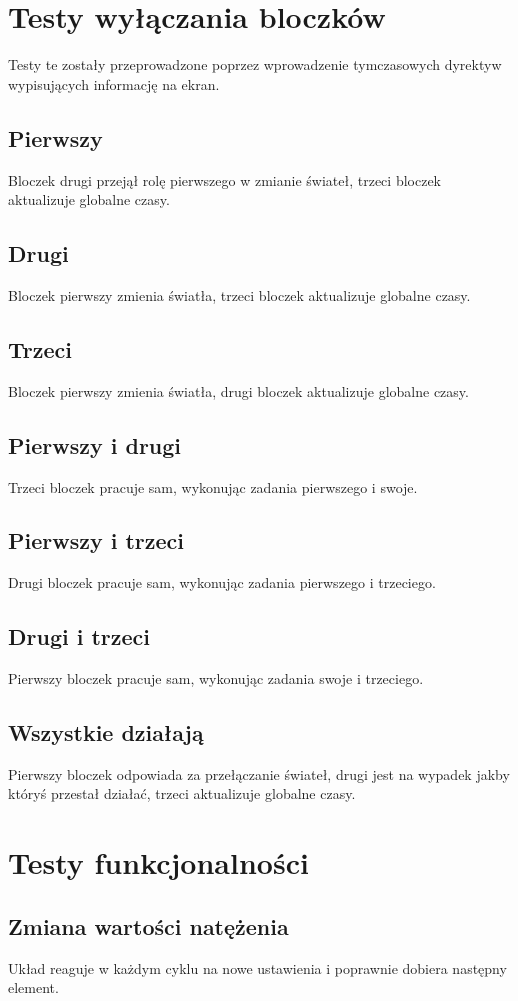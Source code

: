 \documentclass[a4paper, 12pt, titlepage]{article}
\begin{document}
	\section{Testy wyłączania bloczków}
		Testy te zostały przeprowadzone poprzez wprowadzenie tymczasowych dyrektyw wypisujących informację na ekran.
		\subsection{Pierwszy}
			Bloczek drugi przejął rolę pierwszego w zmianie świateł, trzeci bloczek aktualizuje globalne czasy.
		\subsection{Drugi}
			Bloczek pierwszy zmienia światła, trzeci bloczek aktualizuje globalne czasy.
		\subsection{Trzeci}
			Bloczek pierwszy zmienia światła, drugi bloczek aktualizuje globalne czasy.
		\subsection{Pierwszy i drugi}
			Trzeci bloczek pracuje sam, wykonując zadania pierwszego i swoje.
		\subsection{Pierwszy i trzeci}
			Drugi bloczek pracuje sam, wykonując zadania pierwszego i trzeciego.
		\subsection{Drugi i trzeci}
			Pierwszy bloczek pracuje sam, wykonując zadania swoje i trzeciego.
		\subsection{Wszystkie działają}
			Pierwszy bloczek odpowiada za przełączanie świateł, drugi jest na wypadek jakby któryś przestał działać, trzeci aktualizuje globalne czasy.
	\newpage
	\section{Testy funkcjonalności}
		\subsection{Zmiana wartości natężenia}
			Układ reaguje w każdym cyklu na nowe ustawienia i poprawnie dobiera następny element.
\end{document}
